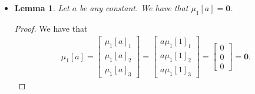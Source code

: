 \documentclass[10pt]{article}
\newtheorem{lemma}{Lemma}[section]
\newcommand{\ve}[1]{\mathbf{#1}}
\begin{document}
\begin{itemize}
      \item \begin{lemma}
        Let $a$ be any constant. We have that $\mu_1[a] = \ve 0$.      
      \end{lemma}
      \begin{proof}
        We have that
        \begin{align*}
          \mu_1[a] = \begin{bmatrix} \mu_1[a]_1 \\ \mu_1[a]_2 \\ \mu_1[a]_3  \end{bmatrix}
          = \begin{bmatrix} a \mu_1[1]_1 \\ a \mu_1[1]_2 \\ a \mu_1[1]_3  \end{bmatrix}
          = \begin{bmatrix} 0 \\ 0 \\ 0 \end{bmatrix} = \ve 0.
        \end{align*}
      \end{proof}
      

\end{itemize}
\end{document}
